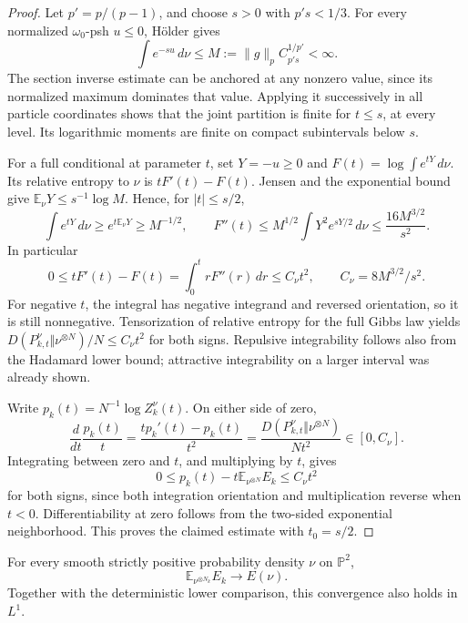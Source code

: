\begin{proof}
Let $p'=p/(p-1)$, and choose $s>0$ with $p's<1/3$. For every
normalized $\omega_0$-psh $u\le0$, H\"older gives
\[
 \int e^{-su}\,d\nu\le
 M:=\|g\|_p C_{p's}^{1/p'}<\infty.
\]
The section inverse estimate can be anchored at any nonzero value,
since its normalized maximum dominates that value. Applying it
successively in all particle coordinates shows that the joint
partition is finite for $t\le s$, at every level. Its logarithmic
moments are finite on compact subintervals below $s$.

For a full conditional at parameter $t$, set $Y=-u\ge0$ and
$F(t)=\log\int e^{tY}\,d\nu$. Its relative entropy to $\nu$ is
$tF'(t)-F(t)$. Jensen and the exponential bound give
$\mathbb E_\nu Y\le s^{-1}\log M$. Hence, for $|t|\le s/2$,
\[
 \int e^{tY}\,d\nu\ge e^{t\mathbb E_\nu Y}\ge M^{-1/2},
 \qquad
 F''(t)\le M^{1/2}\int Y^2e^{sY/2}\,d\nu
                         \le\frac{16M^{3/2}}{s^2}.
\]
In particular
\[
 0\le tF'(t)-F(t)=\int_0^t rF''(r)\,dr
                         \le C_\nu t^2,
 \qquad C_\nu=8M^{3/2}/s^2.
\]
For negative $t$, the integral has negative integrand and reversed
orientation, so it is still nonnegative. Tensorization of relative
entropy for the full Gibbs law yields
$D(P_{k,t}^{\nu}\Vert\nu^{\otimes N})/N\le C_\nu t^2$ for both signs.
Repulsive integrability follows also from the Hadamard lower bound;
attractive integrability on a larger interval was already shown.

Write $p_k(t)=N^{-1}\log Z_k^\nu(t)$. On either side of zero,
\[
 \frac{d}{dt}\frac{p_k(t)}t
 =\frac{t p_k'(t)-p_k(t)}{t^2}
 =\frac{D(P_{k,t}^{\nu}\Vert\nu^{\otimes N})}{Nt^2}
 \in[0,C_\nu].
\]
Integrating between zero and $t$, and multiplying by $t$, gives
\[
 0\le p_k(t)-t\mathbb E_{\nu^{\otimes N}}E_k\le C_\nu t^2
\]
for both signs, since both integration orientation and multiplication
reverse when $t<0$. Differentiability at zero follows from the two-sided
exponential neighborhood. This proves the claimed estimate with
$t_0=s/2$.
\end{proof}

\begin{theorem}
\label{att:general-product-energy}
For every smooth strictly positive probability density $\nu$ on
$\mathbb P^2$,
\[
 \mathbb E_{\nu^{\otimes N_k}}E_k\longrightarrow E(\nu).
\]
Together with the deterministic lower comparison, this convergence
also holds in $L^1$.
\end{theorem}

